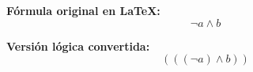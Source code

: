 \documentclass{article}
\begin{document}
\textbf{Fórmula original en LaTeX:}
\[
\lnot a \land b 
\]

\textbf{Versión lógica convertida:}
\[
( ( ( \lnot a ) \land b ) )
\]
\end{document}
